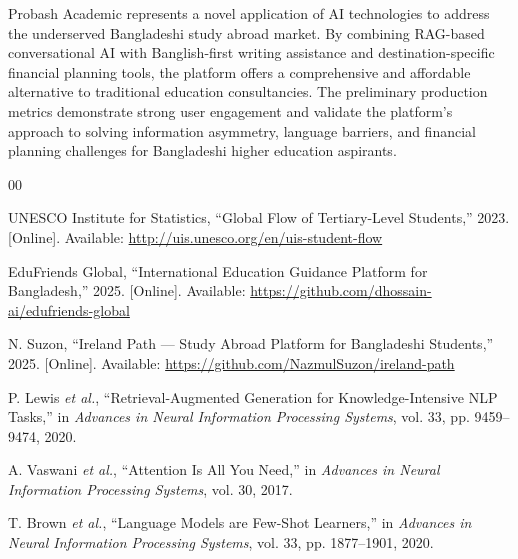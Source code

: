 \documentclass[conference]{IEEEtran}
\begin{document}
Probash Academic represents a novel application of AI technologies to address the underserved Bangladeshi study abroad market. By combining RAG-based conversational AI with Banglish-first writing assistance and destination-specific financial planning tools, the platform offers a comprehensive and affordable alternative to traditional education consultancies. The preliminary production metrics demonstrate strong user engagement and validate the platform's approach to solving information asymmetry, language barriers, and financial planning challenges for Bangladeshi higher education aspirants.


\begin{thebibliography}{00}

UNESCO Institute for Statistics, ``Global Flow of Tertiary-Level Students,'' 2023. [Online]. Available: \url{http://uis.unesco.org/en/uis-student-flow}

EduFriends Global, ``International Education Guidance Platform for Bangladesh,'' 2025. [Online]. Available: \url{https://github.com/dhossain-ai/edufriends-global}

N. Suzon, ``Ireland Path — Study Abroad Platform for Bangladeshi Students,'' 2025. [Online]. Available: \url{https://github.com/NazmulSuzon/ireland-path}

P. Lewis \textit{et al.}, ``Retrieval-Augmented Generation for Knowledge-Intensive NLP Tasks,'' in \textit{Advances in Neural Information Processing Systems}, vol. 33, pp. 9459--9474, 2020.

A. Vaswani \textit{et al.}, ``Attention Is All You Need,'' in \textit{Advances in Neural Information Processing Systems}, vol. 30, 2017.

T. Brown \textit{et al.}, ``Language Models are Few-Shot Learners,'' in \textit{Advances in Neural Information Processing Systems}, vol. 33, pp. 1877--1901, 2020.

\end{thebibliography}
\end{document}

